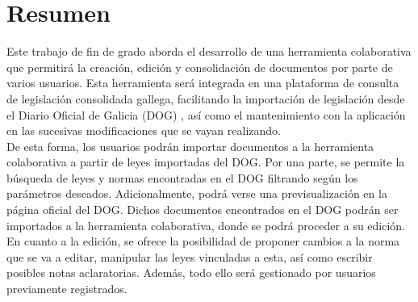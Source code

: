 \pagestyle{plain}
\chapter*{Resumen}
Este trabajo de fin de grado aborda el desarrollo de una herramienta colaborativa que permitirá la creación, edición y consolidación de documentos por parte de varios usuarios. Esta herramienta será integrada en una plataforma de consulta de legislación consolidada gallega, facilitando la importación de legislación desde el Diario Oficial de Galicia (DOG) \cite{dog}, así como el mantenimiento con la aplicación en las sucesivas modificaciones que se vayan realizando.
\\

De esta forma, los usuarios podrán importar documentos a la herramienta colaborativa a partir de leyes importadas del DOG. Por una parte, se permite la búsqueda de leyes y normas encontradas en el DOG filtrando según los parámetros deseados. Adicionalmente, podrá verse una previsualización en la página oficial del DOG. Dichos documentos encontrados en el DOG podrán ser importados a la herramienta colaborativa, donde se podrá proceder a su edición. En cuanto a la edición, se ofrece la posibilidad de proponer cambios a la norma que se va a editar, manipular las leyes vinculadas a esta, así como escribir posibles notas aclaratorias. Además, todo ello será gestionado por usuarios previamente registrados.